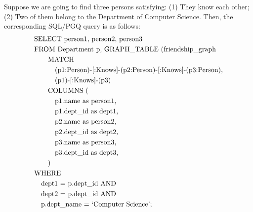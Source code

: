 \begin{example}
    Suppose we are going to find three persons satisfying: (1) They know each other; (2) Two of them belong to the Department of Computer Science.
    Then, the corresponding SQL/PGQ query is as follows:
    \begin{equation}
        \begin{split}
            & \text{SELECT person1, person2, person3} \\
            & \text{FROM Department p, GRAPH\_TABLE (friendship\_graph} \\
            &            \hspace{2em} \text{MATCH} \\
            &            \hspace{3em} \text{(p1:Person)-[:Knows]-(p2:Person)-[:Knows]-(p3:Person),} \\
            &            \hspace{3em} \text{(p1)-[:Knows]-(p3)} \\
            &            \hspace{2em} \text{\text{COLUMNS} (} \\
            &                    \hspace{3em} \text{p1.name as person1,} \\
            &                    \hspace{3em} \text{p1.dept\_id as dept1,} \\            
            &                    \hspace{3em} \text{p2.name as person2,} \\
            &                    \hspace{3em} \text{p2.dept\_id as dept2,} \\ 
            &                    \hspace{3em} \text{p3.name as person3,}  \\
            &                    \hspace{3em} \text{p3.dept\_id as dept3,}  \\
            &        \hspace{2em} \text{)} \\
            & \text{WHERE} \\
            & \hspace{1em} \text{dept1 = p.dept\_id AND} \\
            & \hspace{1em} \text{dept2 = p.dept\_id AND} \\
            & \hspace{1em} \text{p.dept\_name = `\text{Computer Science}';} \\
        \end{split}
    \end{equation}


\end{example}

